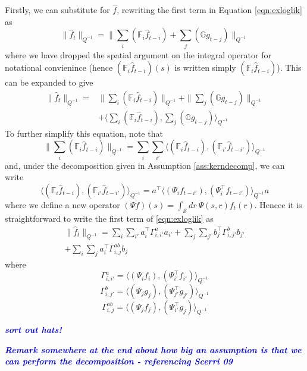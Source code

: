 \documentclass{IEEEtran}
\newcommand{\todo}[1]{\textsf{\emph{\textbf{\textcolor{blue}{#1}}}}}
\newcommand{\inner}[3]{\langle#1,#2\rangle_{#3}}
\newcommand{\dist}[2]{\|#1\|_{#2}}
\begin{document}
Firstly, we can substitute for $\hat{f}$, rewriting the first term in Equation \ref{eqn:exloglik} as
\begin{equation}
	\dist{\hat{f}_t}{Q^{-1}} = \dist{\sum_i(\mathbb{F}_i\hat{f}_{t-i}) + \sum_j(\mathbb{G}g_{t-j})}{Q^{-1}}
\end{equation}
where we have dropped the spatial argument on the integral operator for notational convienince (hence $(\mathbb{F}_i\hat{f}_{t-i})(s)$ is written simply $(\mathbb{F}_i\hat{f}_{t-i})$). This can be expanded to give
\begin{equation}
	\begin{split}
	\dist
		{\hat{f}_t}
		{Q^{-1}} 
	= & \dist
		{\sum_i(\mathbb{F}_i\hat{f}_{t-i})}
		{Q^{-1}} 
	+ \dist
		{\sum_j(\mathbb{G}g_{t-j})}
		{Q^{-1}}\\
	& + \inner
		{\sum_i(\mathbb{F}_i\hat{f}_{t-i})}
		{\sum_j(\mathbb{G}g_{t-j})}
		{Q^{-1}}
	\end{split}
\end{equation}
To further simplify this equation, note that
\begin{equation}
	\dist{\sum_i(\mathbb{F}_i\hat{f}_{t-i})}
	{Q^{-1}} = 
	\sum_i \sum_{i'} \inner
		{(\mathbb{F}_i\hat{f}_{t-i})}
		{(\mathbb{F}_{i'}\hat{f}_{t-i'})}
		{Q^{-1}}
\end{equation}
and, under the decomposition given in Assumption \ref{ass:kerndecomp}, we can write
\begin{equation}
	\inner
		{(\mathbb{F}_i\hat{f}_{t-i})}
		{(\mathbb{F}_{i'}\hat{f}_{t-i'})}
		{Q^{-1}} =  
	 a^\top \inner 
		{(\Psi_i f_{t-i'})}
		{(\Psi_i^\top f_{t-i'}) }
		{Q^{-1}} a
\end{equation}
where we define a new operator $(\Psi f)(s) = \int_\mathcal{S}dr~\Psi(s,r)f_t(r)$. Hencec it is straightforward to write the first term of \ref{eqn:exloglik} as
\begin{equation}
	\begin{split}
	\dist
		{\hat{f}_t}
		{Q^{-1}} = 
		\sum_i\sum_{i'}a_i^\top \Gamma_{i,i'}^a
		a_{i'} 
		+ \sum_j\sum_{j'}b_j^\top \Gamma_{i,j'}^b
		b_{j'} \\
		+ \sum_i\sum_{j}a_i^\top \Gamma_{i,j}^{ab}
		b_j
		\end{split}
\end{equation}
where 
\begin{equation}
	 \Gamma_{i,i'}^a = \inner
		{(\Psi_i f_{i})}
		{(\Psi_{i'}^\top f_{i'})}
		{Q^{-1}}
\end{equation}
\begin{equation}
	\Gamma_{i,j'}^b = \inner
		{(\Psi_j g_{j})}
		{(\Psi_{j'}^\top g_{j'})}
		{Q^{-1}}
\end{equation}
\begin{equation}
	\Gamma_{i,j}^{ab} = \inner
		{(\Psi_j f_{j})}
		{(\Psi_{i'}^\top g_{j})}
		{Q^{-1}}
\end{equation}

\todo{sort out hats!}

\newpage

\todo{Remark somewhere at the end about how big an assumption is that we can perform the decomposition - referencing Scerri 09}
\end{document}

